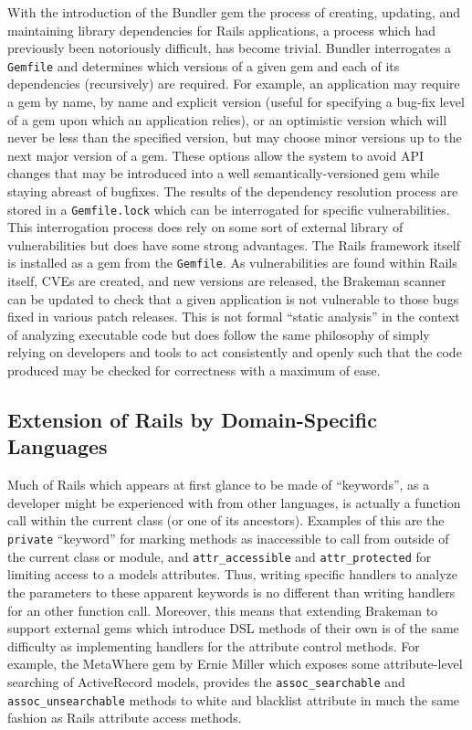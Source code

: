 \documentclass[conference]{IEEEtran}
\begin{document}
With the introduction of the Bundler gem the process of creating, updating, and
maintaining library dependencies for Rails applications, a process which had
previously been notoriously difficult, has become trivial.  Bundler interrogates
a \texttt{Gemfile} and determines which versions of a given gem and each of its
dependencies (recursively) are required.  For example, an application may require
a gem by name, by name and explicit version (useful for specifying a bug-fix
level of a gem upon which an application relies), or an optimistic version which will never be less than the
specified version, but may choose minor versions up to the next major version
of a gem.  These options allow the system to avoid API changes that may be introduced into a well
semantically-versioned gem while staying abreast of bugfixes.  The results of the
dependency resolution process are stored in a \texttt{Gemfile.lock} which can be
interrogated for specific vulnerabilities.  This interrogation process does rely on some
sort of external library of vulnerabilities but does have some strong advantages.  The
Rails framework itself is installed as a gem from the \texttt{Gemfile}.  As
vulnerabilities are found within Rails itself, CVEs are created, and new versions are
released, the Brakeman scanner can be updated to check that a given application is not
vulnerable to those bugs fixed in various patch releases.  This is not formal ``static
analysis'' in the context of analyzing executable code but does follow the same philosophy
of simply relying on developers and tools to act consistently and openly such that the
code produced may be checked for correctness with a maximum of ease.

\subsection{Extension of Rails by Domain-Specific Languages}

Much of Rails which appears at first glance to be made of ``keywords'', as a
developer might be experienced with from other languages, is actually a function
call within the current class (or one of its ancestors).  Examples of this are the
\texttt{private}\cite{private_method} ``keyword'' for marking methods as inaccessible to
call from outside of the current class or module, and \texttt{attr\_accessible} and
\texttt{attr\_protected} for limiting access to a models attributes.  Thus, writing
specific handlers to analyze the parameters to these apparent keywords is no different
than writing handlers for an other function call.  Moreover, this means that extending
Brakeman to support external gems which introduce DSL methods of their own is of the same
difficulty as implementing handlers for the attribute control methods.  For example, the
MetaWhere gem by Ernie Miller which exposes some attribute-level searching of
ActiveRecord models, provides the \texttt{assoc\_searchable} and
\texttt{assoc\_unsearchable} methods to white and blacklist attribute in much the same
fashion as Rails attribute access methods.
\end{document}
